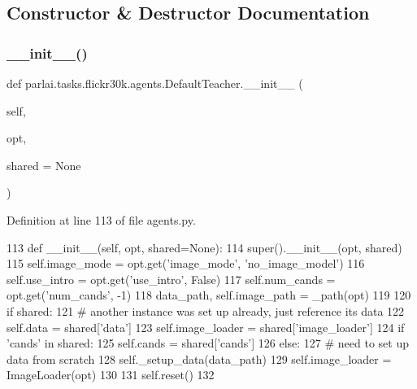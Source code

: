 \subsection{Constructor \& Destructor Documentation}
\mbox{\label{classparlai_1_1tasks_1_1flickr30k_1_1agents_1_1DefaultTeacher_a656b935d2ed6a7c7c17ec8701c506cc8}} 
\subsubsection{\texorpdfstring{\+\_\+\+\_\+init\+\_\+\+\_\+()}{\_\_init\_\_()}}
{\footnotesize\ttfamily def parlai.\+tasks.\+flickr30k.\+agents.\+Default\+Teacher.\+\_\+\+\_\+init\+\_\+\+\_\+ (\begin{DoxyParamCaption}\item[{}]{self,  }\item[{}]{opt,  }\item[{}]{shared = {\ttfamily None} }\end{DoxyParamCaption})}



Definition at line 113 of file agents.\+py.


\begin{DoxyCode}
113     \textcolor{keyword}{def }\_\_init\_\_(self, opt, shared=None):
114         super().\_\_init\_\_(opt, shared)
115         self.image\_mode = opt.get(\textcolor{stringliteral}{'image\_mode'}, \textcolor{stringliteral}{'no\_image\_model'})
116         self.use\_intro = opt.get(\textcolor{stringliteral}{'use\_intro'}, \textcolor{keyword}{False})
117         self.num\_cands = opt.get(\textcolor{stringliteral}{'num\_cands'}, -1)
118         data\_path, self.image\_path = \_path(opt)
119 
120         \textcolor{keywordflow}{if} shared:
121             \textcolor{comment}{# another instance was set up already, just reference its data}
122             self.data = shared[\textcolor{stringliteral}{'data'}]
123             self.image\_loader = shared[\textcolor{stringliteral}{'image\_loader'}]
124             \textcolor{keywordflow}{if} \textcolor{stringliteral}{'cands'} \textcolor{keywordflow}{in} shared:
125                 self.cands = shared[\textcolor{stringliteral}{'cands'}]
126         \textcolor{keywordflow}{else}:
127             \textcolor{comment}{# need to set up data from scratch}
128             self.\_setup\_data(data\_path)
129             self.image\_loader = ImageLoader(opt)
130 
131         self.reset()
132 
\end{DoxyCode}


